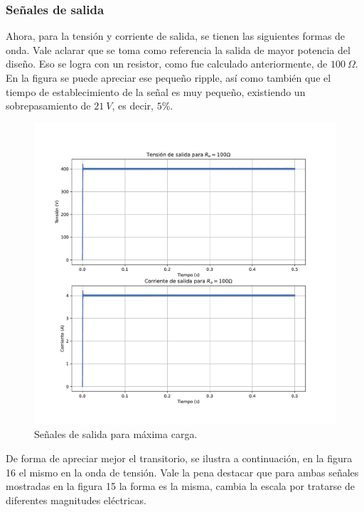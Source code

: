\subsubsection{Señales de salida}

Ahora, para la tensión y corriente de salida, se tienen las siguientes formas de onda. Vale aclarar que se toma como referencia la salida de mayor potencia del diseño. Eso se logra con un resistor, como fue calculado anteriormente, de $100 \ \Omega$. En la figura se puede apreciar ese pequeño ripple, así como también que el tiempo de establecimiento de la señal es muy pequeño, existiendo un sobrepasamiento de $21 \ V$, es decir, $5\%$.

\begin{figure}
	\centering
	\includegraphics[width=1\linewidth]{img/salida_40}
	\caption{Señales de salida para máxima carga.}
	\label{fig:salida40}
\end{figure}

De forma de apreciar mejor el transitorio, se ilustra a continuación, en la figura 16 el mismo en la onda de tensión. Vale la pena destacar que para ambas señales mostradas en la figura 15 la forma es la misma, cambia la escala por tratarse de diferentes magnitudes eléctricas.

